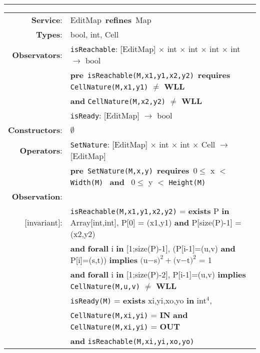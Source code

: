 \documentclass{article}
\begin{document}
\vspace{5mm}\hrule\vspace{5mm}

\begin{tabular}{rl}
\textbf{Service}: & \textrm{EditMap}~\textbf{refines}~\textrm{Map}  \\
\textbf{Types}: & \textrm{bool}, \textrm{int}, \textrm{Cell}  \\
\textbf{Observators}: & \texttt{isReachable}: \textrm{[EditMap]} $\times$ \textrm{int} $\times$ \textrm{int} $\times$ \textrm{int} $\times$ \textrm{int} $\rightarrow$ \textrm{bool} \\
& \quad\quad \textbf{pre}~\texttt{isReachable(M,x1,y1,x2,y2)}~\textbf{requires}~ \texttt{CellNature(M,x1,y1)} $\neq$ \textbf{WLL} \\ & \quad\quad\quad\quad \textbf{and} \texttt{CellNature(M,x2,y2)} $\neq$ \textbf{WLL}  \\
& \texttt{isReady}: \textrm{[EditMap]} $\rightarrow$ \textrm{bool} \\
\textbf{Constructors}: & $\emptyset$\\
\textbf{Operators}: & \texttt{SetNature}: \textrm{[EditMap]} $\times$ \textrm{int} $\times$ \textrm{int} $\times$ Cell $\rightarrow$ \textrm{[EditMap]} \\
& \quad\quad \textbf{pre}~\texttt{SetNature(M,x,y)}~\textbf{requires}~$0 \leq$ x $<$ \texttt{Width(M)}  ~\textbf{and}~ $0 \leq$ y $<$ \texttt{Height(M)} \\
\textbf{Observation}: \\
$[$invariant$]$: & \texttt{isReachable(M,x1,y1,x2,y2)} = \textbf{exists} P \textbf{in} \textrm{Array}$[$\textrm{int},\textrm{int}$]$, P[0] = (x1,y1) \textbf{and} P[size(P)-1] = (x2,y2) \\ & \quad\quad\quad\quad \textbf{and} \textbf{forall} i \textbf{in} [1;size(P)-1], (P[i-1]=(u,v) \textbf{and} P[i]=(s,t)) \textbf{implies} $($u$-$s$)^2 + ($v$-$t$)^2$ = 1
\\ & \quad\quad\quad\quad \textbf{and} \textbf{forall} i \textbf{in} [1;size(P)-2], P[i-1]=(u,v) \textbf{implies} \texttt{CellNature(M,u,v)} $\neq$ \textbf{WLL} \\
& \texttt{isReady(M)} = \textbf{exists} xi,yi,xo,yo \textbf{in} \textrm{int}$^4$,\\
& \quad\quad\quad\quad\quad\quad\quad\quad \texttt{CellNature(M,xi,yi)} = \textbf{IN} \textbf{and} \texttt{CellNature(M,xi,yi)} = \textbf{OUT} \\
& \quad\quad\quad\quad\quad\quad\quad\quad \textbf{and} \texttt{isReachable(M,xi,yi,xo,yo)} \\

\end{tabular}
\end{document}
